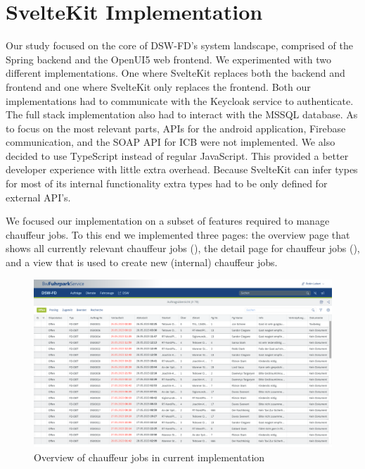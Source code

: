 \section{SvelteKit Implementation}

Our study focused on the core of DSW-FD's system landscape, comprised of the Spring backend and the OpenUI5 web frontend. We experimented with two different implementations. One where SvelteKit replaces both the backend and frontend and one where SvelteKit only replaces the frontend. Both our implementations had to communicate with the Keycloak service to authenticate. The full stack implementation also had to interact with the MSSQL database. As to focus on the most relevant parts, APIs for the android application, Firebase communication, and the SOAP API for ICB were not implemented. We also decided to use TypeScript instead of regular JavaScript. This provided a better developer experience with little extra overhead. Because SvelteKit can infer types for most of its internal functionality extra types had to be only defined for external API's.

We focused our implementation on a subset of features required to manage chauffeur jobs. To this end we implemented three pages: the overview page that shows all currently relevant chauffeur jobs (), the detail page for chauffeur jobs (), and a view that is used to create new (internal) chauffeur jobs.

\begin{figure}
    \centering
    \includegraphics[width=\linewidth]{assets/current-auftrag-overview}
    \caption{Overview of chauffeur jobs in current implementation}
    \label{fig:current-overview-auftrag}
\end{figure}

